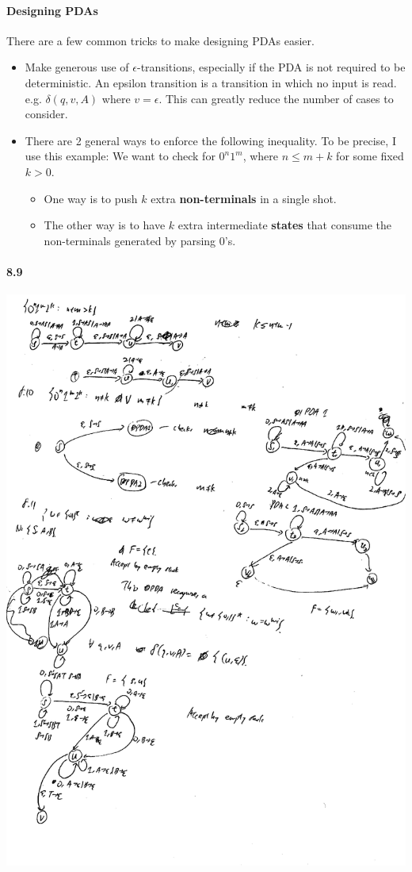 \documentclass{article}
\begin{document}
\paragraph{Designing PDAs}
There are a few common tricks to make designing PDAs easier.
\begin{itemize}
	\item Make generous use of $\epsilon$-transitions, especially if the PDA is not required to be deterministic. An epsilon transition is a transition in which no input is read. e.g. $\delta(q, v, A)$ where $v=\epsilon$. This can greatly reduce the number of cases to consider.
	\item There are 2 general ways to enforce the following inequality. To be precise, I use this example: We want to check for $0^n1^m$, where $n\leq m+k$ for some fixed $k>0$.
	\begin{itemize}
		\item One way is to push $k$ extra \textbf{non-terminals} in a single shot.
		\item The other way is to have $k$ extra intermediate \textbf{states} that consume the non-terminals generated by parsing $0$'s.
	\end{itemize}
\end{itemize}

\paragraph{8.9}\mbox{}

\includegraphics[scale=0.7]{q8_9}
\end{document}
